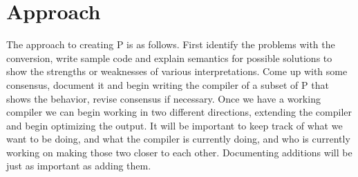 \section{Approach}
The approach to creating P is as follows. First identify the problems with the conversion, write sample code and explain semantics for possible solutions to show the 
strengths or weaknesses of various interpretations. Come up with some consensus, document it and begin writing the compiler of a subset of P that shows the behavior, 
revise consensus if necessary. Once we have a working compiler we can begin working in two different directions, extending the compiler and begin optimizing the output. 
It will be important to keep track of what we want to be doing, and what the compiler is currently doing, and who is currently working on making those two closer to each 
other. Documenting additions will be just as important as adding them.

